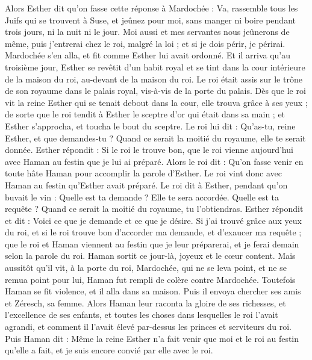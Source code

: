 \begin{multicols}{2}
Alors Esther dit qu’on fasse cette réponse à Mardochée :
Va, rassemble tous les Juifs qui se trouvent à Suse, et jeûnez pour moi, sans manger ni boire pendant trois jours, ni la nuit ni le jour. Moi aussi et mes servantes nous jeûnerons de même, puis j'entrerai chez le roi, malgré la loi ; et si je dois périr, je périrai.
Mardochée s'en alla, et fit comme Esther lui avait ordonné.
\VerseOne{}Et il arriva qu’au troisième jour, Esther se revêtit d'un habit royal et se tint dans la cour intérieure de la maison du roi, au-devant de la maison du roi. Le roi était assis sur le trône de son royaume dans le palais royal, vis-à-vis de la porte du palais.
Dès que le roi vit la reine Esther qui se tenait debout dans la cour, elle trouva grâce à ses yeux ; de sorte que le roi tendit à Esther le sceptre d’or qui était dans sa main ; et Esther s’approcha, et toucha le bout du sceptre.
Le roi lui dit : Qu'as-tu, reine Esther, et que demandes-tu ? Quand ce serait la moitié du royaume, elle te serait donnée.
Esther répondit : Si le roi le trouve bon, que le roi vienne aujourd'hui avec Haman au festin que je lui ai préparé.
Alors le roi dit : Qu'on fasse venir en toute hâte Haman pour accomplir la parole d'Esther. Le roi vint donc avec Haman au festin qu'Esther avait préparé.
Le roi dit à Esther, pendant qu’on buvait le vin : Quelle est ta demande ? Elle te sera accordée. Quelle est ta requête ? Quand ce serait la moitié du royaume, tu l’obtiendras.
Esther répondit et dit : Voici ce que je demande et ce que je désire.
Si j'ai trouvé grâce aux yeux du roi, et si le roi trouve bon d'accorder ma demande, et d'exaucer ma requête ; que le roi et Haman viennent au festin que je leur préparerai, et je ferai demain selon la parole du roi.
Haman sortit ce jour-là, joyeux et le cœur content. Mais aussitôt qu'il vit, à la porte du roi, Mardochée, qui ne se leva point, et ne se remua point pour lui, Haman fut rempli de colère contre Mardochée.
Toutefois Haman se fit violence, et il alla dans sa maison. Puis il envoya chercher ses amis et Zéresch, sa femme.
Alors Haman leur raconta la gloire de ses richesses, et l’excellence de ses enfants, et toutes les choses dans lesquelles le roi l’avait agrandi, et comment il l’avait élevé par-dessus les princes et serviteurs du roi.
Puis Haman dit : Même la reine Esther n'a fait venir que moi et le roi au festin qu'elle a fait, et je suis encore convié par elle avec le roi.

\end{multicols}
